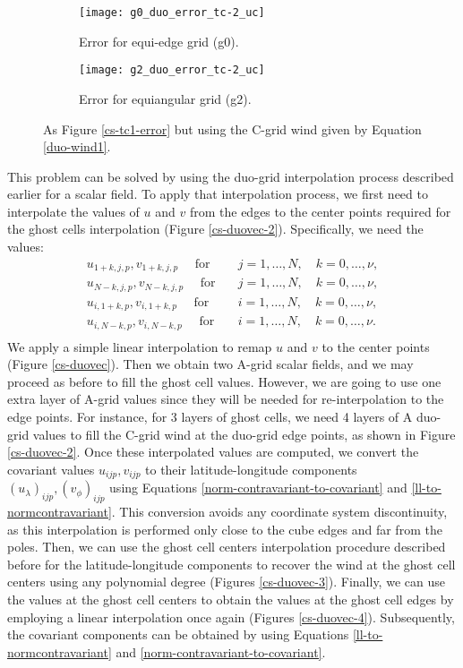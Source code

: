 \begin{figure}[!htb]
	\centering
	\begin{subfigure}{0.45\textwidth}
		\centering
		\texttt{[image: g0\_duo\_error\_tc-2\_uc]}
		\caption{Error for equi-edge grid (g0).\label{cs-duoscalar-tc2-g0}}
	\end{subfigure}
	\begin{subfigure}{0.45\textwidth}
		\centering
		\texttt{[image: g2\_duo\_error\_tc-2\_uc]}
		\caption{Error for equiangular grid (g2).\label{cs-duoscalar-tc2-g2}}
	\end{subfigure}
	\caption{As Figure \ref{cs-tc1-error} but using the C-grid wind given by Equation \eqref{duo-wind1}.\label{cs-tc2-error}}
\end{figure}

This problem can be solved by using the duo-grid interpolation process described earlier for a scalar field.
To apply that interpolation process, we first need to interpolate the values of $u$ and $v$ from the
edges to the center points required for the ghost cells interpolation (Figure \ref{cs-duovec-2}).
Specifically, we need the values:
\begin{align*}
	u_{1+k,j,p}, v_{1+k,j,p} \quad \text{ for} \quad &j=1, \ldots, N, \quad k=0, \ldots, \nu,\\
	u_{N-k,j,p}, v_{N-k,j,p} \quad \text{ for} \quad &j=1, \ldots, N, \quad k=0, \ldots, \nu,\\
	u_{i,1+k,p}, v_{i,1+k,p} \quad \text{ for} \quad &i=1, \ldots, N, \quad k=0, \ldots, \nu,\\
	u_{i,N-k,p}, v_{i,N-k,p} \quad \text{ for} \quad &i=1, \ldots, N, \quad k=0, \ldots, \nu.\\
\end{align*}
We apply a simple linear interpolation to remap $u$ and $v$ to the center points (Figure \ref{cs-duovec}).
Then we obtain two A-grid scalar fields, and we may proceed as before to fill the ghost cell values.
However, we are going to use one extra layer of A-grid values since they will be needed for re-interpolation to the edge points.
For instance, for 3 layers of ghost cells, we need 4 layers of A duo-grid values to fill the C-grid wind at the duo-grid edge points, as shown in Figure \ref{cs-duovec-2}.
Once these interpolated values are computed, we convert the covariant values $u_{ijp}, v_{ijp}$
to their latitude-longitude components $(u_{\lambda})_{ijp}, (v_{\phi})_{ijp}$ using Equations \eqref{norm-contravariant-to-covariant} and
\eqref{ll-to-normcontravariant}.
This conversion avoids any coordinate system discontinuity, as this interpolation is performed only close to the cube edges and far from the poles.
Then, we can use the ghost cell centers interpolation procedure described before for the latitude-longitude components
to recover the wind at the ghost cell centers using any polynomial degree (Figures \ref{cs-duovec-3}).
Finally, we can use the values at the ghost cell centers to obtain the values at the ghost cell edges
by employing a linear interpolation once again (Figures \ref{cs-duovec-4}).
Subsequently, the covariant components can be obtained by using Equations \eqref{ll-to-normcontravariant} and \eqref{norm-contravariant-to-covariant}.

